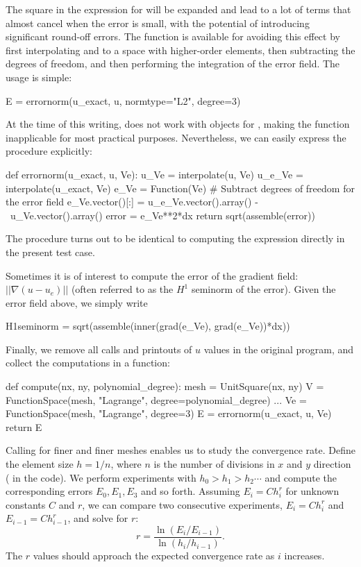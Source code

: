 The square in the expression for  will be expanded and lead
to a lot of terms that almost cancel when the error is small, with the
potential of introducing significant round-off errors.  The function
 is available for avoiding this effect by first
interpolating  and  to a space with higher-order
elements, then subtracting the degrees of freedom, and then performing
the integration of the error field. The usage is simple:
\begin{python}
E = errornorm(u_exact, u, normtype="L2", degree=3)
\end{python}
At the time of this writing,  does not work with
 objects for , making the function
inapplicable for most practical purposes. Nevertheless, we can easily
express the procedure explicitly:
\begin{python}
def errornorm(u_exact, u, Ve):
    u_Ve = interpolate(u, Ve)
    u_e_Ve = interpolate(u_exact, Ve)
    e_Ve = Function(Ve)
    # Subtract degrees of freedom for the error field
    e_Ve.vector()[:] = u_e_Ve.vector().array() - \
                       u_Ve.vector().array()
    error = e_Ve**2*dx
    return sqrt(assemble(error))
\end{python}
The  procedure turns out to be identical to computing
the expression \emp{(u\_e - u)**2*dx} directly in the present test case.

Sometimes it is of interest to compute the error of the gradient field:
$||\nabla (u-u_e)||$ (often referred to as the $H^1$ seminorm of the
error).  Given the error field \emp{e\_Ve} above, we simply write
\begin{python}
  H1seminorm = sqrt(assemble(inner(grad(e_Ve), grad(e_Ve))*dx))
\end{python}

Finally, we remove all  calls and printouts of $u$ values in
the original program, and collect the computations in a function:
\begin{python}
def compute(nx, ny, polynomial_degree):
    mesh = UnitSquare(nx, ny)
    V = FunctionSpace(mesh, "Lagrange", degree=polynomial_degree)
    ...
    Ve = FunctionSpace(mesh, "Lagrange", degree=3)
    E = errornorm(u_exact, u, Ve)
    return E
\end{python}

Calling  for finer and finer meshes enables us to study
the convergence rate. Define the element size $h=1/n$, where $n$ is the
number of divisions in $x$ and $y$ direction (\emp{nx=ny} in the code). We
perform experiments with $h_0>h_1>h_2\cdots$ and compute the corresponding
errors $E_0, E_1, E_3$ and so forth.  Assuming $E_i=Ch_i^r$ for unknown
constants $C$ and $r$, we can compare two consecutive experiments,
$E_i=Ch_i^r$ and $E_{i-1}=Ch_{i-1}^r$, and solve for $r$:
\begin{equation}
  r = \frac{\ln(E_i/E_{i-1})}{\ln (h_i/h_{i-1})}.
\end{equation}
The $r$ values should approach the expected convergence rate
 as $i$ increases.

